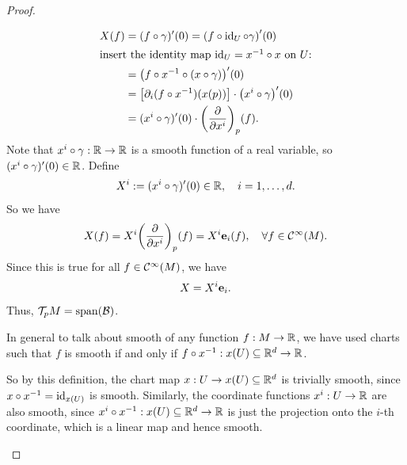 \begin{proof}
\begin{enumerate}
		      \begin{align*}
			      X(f) & = (f \circ \gamma)'(0) = \qty(f \circ \operatorname{id}_U \circ \gamma)'(0)              \\
			      \shortintertext{insert the identity map \(\operatorname{id}_U = x^{-1} \circ x\) on \(U\):}
			           & = \qty(f \circ x^{-1} \circ (x \circ \gamma))'(0)                          \\
			           & = \qty[\partial_i (f \circ x^{-1})(x(p))] \cdot \qty(x^i \circ \gamma)'(0) \\
			           & = (x^i \circ \gamma)'(0) \cdot \qty(\pdv{x^i})_p (f).
		      \end{align*}
		      Note that \(x^i \circ \gamma: \mathbb R \to \mathbb R\) is a smooth function of a real variable, so \((x^i \circ \gamma)'(0) \in \mathbb R\). Define
		      \begin{equation}
			      X^i := (x^i \circ \gamma)'(0) \in \mathbb R, \quad i = 1, \ldots, d.
		      \end{equation}
		      So we have
		      \begin{equation}
			      X(f) = X^i \qty(\pdv{x^i})_p (f) = X^i \vb{e}_i(f), \quad \forall f \in \mathcal C^\infty(M).
		      \end{equation}
		      Since this is true for all \(f \in \mathcal C^\infty(M)\), we have
		      \begin{equation}
			      X = X^i \vb{e}_i.
		      \end{equation}
		      Thus, \(\mathcal T_p M = \operatorname{span}(\mathcal B)\).

		      \begin{remark}
			      In general to talk about smooth of any function \(f: M \to \mathbb R\), we have used charts such that \(f\) is smooth if and only if \(f \circ x^{-1}: x(U) \subseteq \mathbb R^d \to \mathbb R\).

			      So by this definition, the chart map \(x: U \to x(U) \subseteq \mathbb R^d\) is trivially smooth, since \(x \circ x^{-1} = \operatorname{id}_{x(U)}\) is smooth. Similarly, the coordinate functions \(x^i: U \to \mathbb R\) are also smooth, since \(x^i \circ x^{-1}: x(U) \subseteq \mathbb R^d \to \mathbb R\) is just the projection onto the \(i\)-th coordinate, which is a linear map and hence smooth.
		      \end{remark}


\end{enumerate}
\end{proof}
